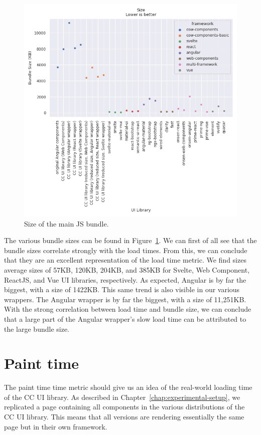 \begin{figure}[htbp]
  \includegraphics[width=\columnwidth]{plots/size.png}
  \caption{Size of the main JS bundle.}
  \label{fig:results:size}
  \centering
\end{figure}


The various bundle sizes can be found in Figure~\ref{fig:results:size}. We can first of all see that the bundle sizes correlate strongly with the load times. From this, we can conclude that they are an excellent representation of the load time metric. We find sizes average sizes of 57KB, 120KB, 204KB, and 385KB for Svelte, Web Component, ReactJS, and Vue UI libraries, respectively. As expected, Angular is by far the biggest, with a size of 1422KB. This same trend is also visible in our various wrappers. The Angular wrapper is by far the biggest, with a size of 11,251KB. With the strong correlation between load time and bundle size, we can conclude that a large part of the Angular wrapper's slow load time can be attributed to the large bundle size.

\section{Paint time}
The paint time time metric should give us an idea of the real-world loading time of the CC UI library. As described in Chapter~\ref{chap:experimental-setup}, we replicated a page containing all components in the various distributions of the CC UI library. This means that all versions are rendering essentially the same page but in their own framework.

